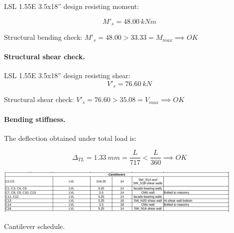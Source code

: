 \noindent LSL 1.55E 3.5x18'' design resisting moment:

\begin{equation}
  M'_s= 48.00\ kN m
\end{equation}

\noindent Structural bending check: $M'_s = 48.00 > 33.33 = M_{max} \implies OK$

\paragraph{Structural shear check.}

\noindent LSL 1.55E 3.5x18'' design resisting shear:
\begin{equation}
  V'_s= 76.60\ kN
\end{equation}

\noindent Structural shear check: $V'_s = 76.60 > 35.08 = V_{max} \implies OK$

\paragraph{Bending stiffness.}
The deflection obtained under total load is:

\begin{equation}
  \Delta_{TL}= 1.33\ mm= \frac{L}{717} < \frac{L}{360} \implies OK
\end{equation}

\begin{table}
  \begin{center}
  \includegraphics[width=120mm]{figures/cantilever_schedule}
  \end{center}
  \caption{Cantilever schedule.}\label{fg_2nd_floor_cantilevers_schedule}
\end{table}
